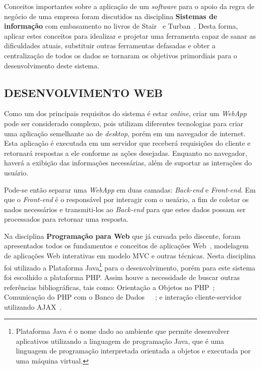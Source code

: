 \documentclass[
  12pt,				%
  openany,
  oneside,
  a4paper,			%
  english,			%
  brazil
]{article}
\numberwithin{figure}{section}
\numberwithin{table}{section}
\begin{document}
Conceitos importantes sobre a aplicação de um \textit{software} para o apoio da regra de negócio de uma empresa foram discutidos na disciplina \textbf{Sistemas de informação} com embasamento no livros de Stair~\cite{SI_principios} e Turban~\cite{SI_turban}. Desta forma, aplicar estes conceitos para idealizar e projetar uma ferramenta capaz de sanar as dificuldades atuais, substituir outras ferramentas defasadas e obter a centralização de todos os dados se tornaram os objetivos primordiais para o desenvolvimento deste sistema.

\subsection{DESENVOLVIMENTO WEB}
Como um dos principais requisitos do sistema é estar \textit{online}, criar um \textit{WebApp} pode ser considerado complexo, pois utilizam diferentes tecnologias para criar uma aplicação semelhante ao de \textit{desktop}, porém em um navegador de internet. Esta aplicação é executada em um servidor que receberá requisições do cliente e retornará respostas a ele conforme as ações desejadas. Enquanto no navegador, haverá a exibição das informações necessárias, além de suportar as interações do usuário.

Pode-se então separar uma \textit{WebApp} em duas camadas: \textit{Back-end} e \textit{Front-end}. Em que o \textit{Front-end} é o responsável por interagir com o usuário, a fim de coletar os nados necessários e transmiti-los ao \textit{Back-end} para que estes dados possam ser processados para retornar uma resposta.

Na disciplina \textbf{Programação para Web} que já cursada pelo discente, foram apresentados todos os fundamentos e conceitos de aplicações Web~\cite{pWeb_sebesta}, modelagem de aplicações Web interativas em modelo MVC e outras técnicas. Nesta disciplina foi utilizado a Plataforma Java\footnote{Plataforma Java é o nome dado ao ambiente que permite desenvolver aplicativos utilizando a linguagem de programação Java, que é uma linguagem de programação interpretada orientada a objetos e executada por uma máquina virtual.} para o desenvolvimento, porém para este sistema foi escolhido a plataforma PHP. Assim houve a necessidade de buscar outras referências bibliográficas, tais como: Orientação a Objetos no PHP~\cite{PHP_Novatec_poo}; Comunicação do PHP com o Banco de Dados~\cite{PHP_Novatec_dev}~\cite{PHP_Novatec_appWeb}~\cite{PHP_mysql}; e interação cliente-servidor utilizando AJAX~\cite{PHP_Novatec_ajax}.
\end{document}
